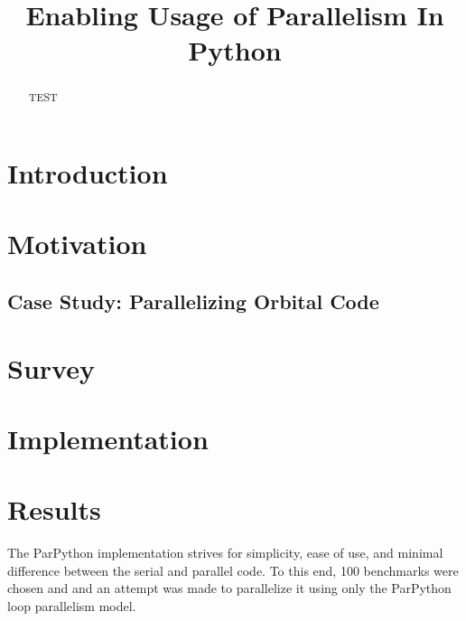 \documentclass[conference]{IEEEtran}
\begin{document}
\title{Enabling Usage of Parallelism In Python}
\author{
}

\maketitle

\begin{abstract}
TEST
\end{abstract}

\section{Introduction}




\section{Motivation}



\subsection{Case Study: Parallelizing Orbital Code}



\section{Survey}

\section{Implementation}

\section{Results}

The ParPython implementation strives for simplicity, ease of use, and minimal difference between the serial and parallel code. 
To this end, 100 benchmarks were chosen and and an attempt was made to parallelize it using only the ParPython loop parallelism model.
\end{document}
